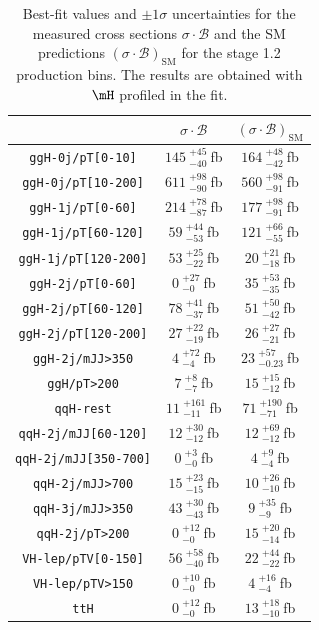 \begin{table}[hb]
	\begin{center}
		\caption{
		Best-fit values and $\pm 1\sigma$ uncertainties for the measured cross sections $\sigma\cdot\mathcal{B}$ and the SM predictions $(\sigma\cdot\mathcal{B})_{\mathrm{SM}}$ for the stage 1.2 production bins.
		The results are obtained with $\mH$ profiled in the fit.
		\label{tab:stage1p2}
			}
    \renewcommand{\arraystretch}{1.5}
    \begin{tabular}{ccc}
	\hline
	& $\sigma\cdot\mathcal{B}$ & $(\sigma\cdot\mathcal{B})_{\mathrm{SM}}$ \\
	\hline
	{\tt ggH-0j/pT[0-10]} & $145~^{+45}_{-40}~$fb & $164~^{+48}_{-42}~$fb \\
	{\tt ggH-0j/pT[10-200]} & $611~^{+98}_{-90}~$fb & $560~^{+98}_{-91}~$fb \\
	{\tt ggH-1j/pT[0-60]} & $214~^{+78}_{-87}~$fb & $177~^{+98}_{-91}~$fb \\
    {\tt ggH-1j/pT[60-120]} & $59~^{+44}_{-53}~$fb & $121~^{+66}_{-55}~$fb \\
	{\tt ggH-1j/pT[120-200]} & $53~^{+25}_{-22}~$fb & $20~^{+21}_{-18}~$fb \\
	{\tt ggH-2j/pT[0-60]} & $0~^{+27}_{-0}~$fb & $35~^{+53}_{-35}~$fb \\
	{\tt ggH-2j/pT[60-120]} & $78~^{+41}_{-37}~$fb & $51~^{+50}_{-42}~$fb \\
	{\tt ggH-2j/pT[120-200]} & $27~^{+22}_{-19}~$fb & $26~^{+27}_{-21}~$fb \\
	{\tt ggH-2j/mJJ>350} & $4~^{+72}_{-4}~$fb & $23~^{+57}_{-0.23}~$fb \\
	{\tt ggH/pT>200} & $7~^{+8}_{-7}~$fb & $15~^{+15}_{-12}~$fb \\
	{\tt qqH-rest} & $11~^{+161}_{-11}~$fb & $71~^{+190}_{-71}~$fb \\
	{\tt qqH-2j/mJJ[60-120]} & $12~^{+30}_{-12}~$fb & $12~^{+69}_{-12}~$fb \\
	{\tt qqH-2j/mJJ[350-700]} & $0~^{+3}_{-0}~$fb & $4~^{+9}_{-4}~$fb \\
	{\tt qqH-2j/mJJ>700} & $15~^{+23}_{-15}~$fb & $10~^{+26}_{-10}~$fb \\
	{\tt qqH-3j/mJJ>350} & $43~^{+30}_{-43}~$fb & $9~^{+35}_{-9}~$fb \\
	{\tt qqH-2j/pT>200} & $0~^{+12}_{-0}~$fb & $15~^{+20}_{-14}~$fb \\
	{\tt VH-lep/pTV[0-150]} & $56~^{+58}_{-40}~$fb & $22~^{+44}_{-22}~$fb \\
	{\tt VH-lep/pTV>150} & $0~^{+10}_{-0}~$fb & $4~^{+16}_{-4}~$fb \\
	{\tt ttH} & $0~^{+12}_{-0}~$fb & $13~^{+18}_{-10}~$fb \\
	\hline
	\end{tabular}
 \end{center}
 \end{table}

